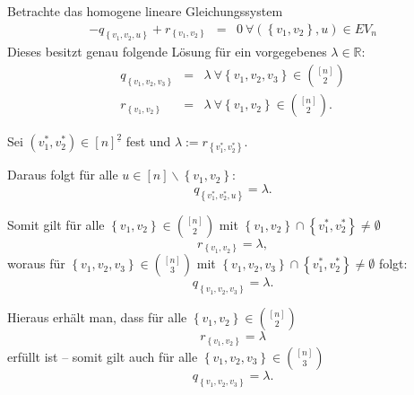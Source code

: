 \documentclass[10p,a4paper,BCOR = 12mm, DIV=15]{scrbook}
\begin{document}
{\begin{Le}
\label{le:loesung_transponiert_nsymmxy}
Betrachte das homogene lineare Gleichungssystem
\begin{eqnarray*}
-q_{\left\{v_1, v_2, u\right\}} + r_{\left\{v_1, v_2\right\}} & = &  0\ \forall \left(\left\{v_1, v_2\right\}, u\right)\in EV_n
\end{eqnarray*}
Dieses besitzt genau folgende Lösung für ein vorgegebenes $\lambda\in \mathbb{R}$:
\begin{eqnarray*}
q_{\left\{v_1, v_2, v_3\right\}} & = & \lambda \ \forall \left\{v_1, v_2, v_3\right\} \in {\left[n\right] \choose 2} \\
r_{\left\{v_1, v_2\right\}} & = & \lambda \ \forall \left\{v_1, v_2\right\}\in {\left[n\right] \choose 2}.
\end{eqnarray*}
\end{Le}
\begin{bew}
Sei $\left(v_1^*, v_2^*\right) \in \left[n\right]^{\underline{2}}$ fest und $\lambda := r_{\left\{v_1^*, v_2^*\right\}}$.

Daraus folgt für alle $u \in \left[n\right] \backslash \left\{v_1, v_2\right\}$:
\begin{displaymath}
q_{\left\{v_1^*, v_2^*, u\right\}} = \lambda.
\end{displaymath}

Somit gilt für alle $\left\{v_1, v_2\right\} \in {\left[n\right] \choose 2}$ mit $\left\{v_1, v_2\right\} \cap \left\{v_1^*, v_2^*\right\} \neq \emptyset$
\begin{displaymath}
r_{\left\{v_1, v_2\right\}} = \lambda,
\end{displaymath}
woraus für $\left\{v_1, v_2, v_3\right\} \in {\left[n\right] \choose 3}$ mit $\left\{v_1, v_2, v_3\right\} \cap \left\{v_1^*, v_2^*\right\} \neq \emptyset$ folgt:
\begin{displaymath}
q_{\left\{v_1, v_2, v_3\right\}} = \lambda.
\end{displaymath}

Hieraus erhält man, dass für alle $\left\{v_1, v_2\right\} \in {\left[n\right] \choose 2}$
\begin{displaymath}
r_{\left\{v_1, v_2\right\}} = \lambda
\end{displaymath}
erfüllt ist -- somit gilt auch für alle $\left\{v_1, v_2, v_3\right\} \in {\left[n\right] \choose 3}$
\begin{displaymath}
q_{\left\{v_1, v_2, v_3\right\}} = \lambda.
\end{displaymath}
\end{bew}

}
\end{document}
